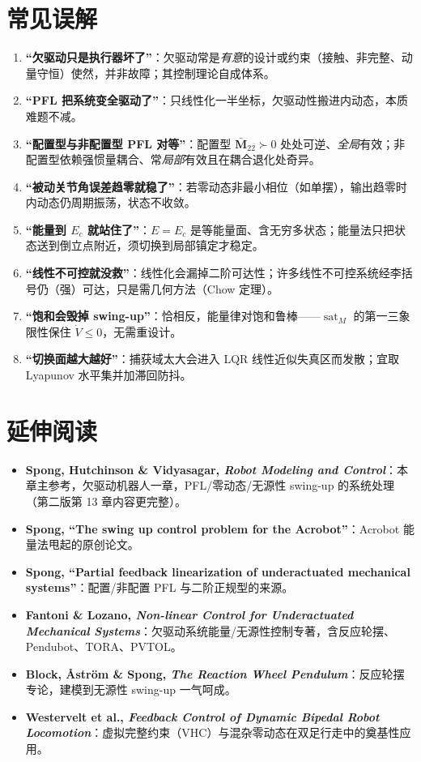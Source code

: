 \section*{常见误解}
\begin{enumerate}
  \item \textbf{“欠驱动只是执行器坏了”}：欠驱动常是\emph{有意}的设计或约束（接触、非完整、动量守恒）使然，并非故障；其控制理论自成体系。
  \item \textbf{“PFL 把系统变全驱动了”}：只线性化一半坐标，欠驱动性搬进内动态，本质难题不减。
  \item \textbf{“配置型与非配置型 PFL 对等”}：配置型 $\bar{\mathbf{M}}_{22}\succ0$ 处处可逆、\emph{全局}有效；非配置型依赖强惯量耦合、常\emph{局部}有效且在耦合退化处奇异。
  \item \textbf{“被动关节角误差趋零就稳了”}：若零动态非最小相位（如单摆），输出趋零时内动态仍周期振荡，状态不收敛。
  \item \textbf{“能量到 $E_c$ 就站住了”}：$E=E_c$ 是等能量面、含无穷多状态；能量法只把状态送到倒立点附近，须切换到局部镇定才稳定。
  \item \textbf{“线性不可控就没救”}：线性化会漏掉二阶可达性；许多线性不可控系统经李括号仍（强）可达，只是需几何方法（Chow 定理）。
  \item \textbf{“饱和会毁掉 swing-up”}：恰相反，能量律对饱和鲁棒——$\operatorname{sat}_M$ 的第一三象限性保住 $\dot{V}\le0$，无需重设计。
  \item \textbf{“切换面越大越好”}：捕获域太大会进入 LQR 线性近似失真区而发散；宜取 Lyapunov 水平集并加滞回防抖。
\end{enumerate}

\section*{延伸阅读}
\begin{itemize}
  \item \textbf{Spong, Hutchinson \& Vidyasagar, \emph{Robot Modeling and Control}}\cite{spong2006robot}：本章主参考，欠驱动机器人一章，PFL/零动态/无源性 swing-up 的系统处理（第二版第 13 章内容更完整）。
  \item \textbf{Spong, ``The swing up control problem for the Acrobot''}\cite{spong1995swingup}：Acrobot 能量法甩起的原创论文。
  \item \textbf{Spong, ``Partial feedback linearization of underactuated mechanical systems''}\cite{spong1994pfl}：配置/非配置 PFL 与二阶正规型的来源。
  \item \textbf{Fantoni \& Lozano, \emph{Non-linear Control for Underactuated Mechanical Systems}}\cite{fantoni2002nonlinear}：欠驱动系统能量/无源性控制专著，含反应轮摆、Pendubot、TORA、PVTOL。
  \item \textbf{Block, Åström \& Spong, \emph{The Reaction Wheel Pendulum}}\cite{block2007reaction}：反应轮摆专论，建模到无源性 swing-up 一气呵成。
  \item \textbf{Westervelt et al., \emph{Feedback Control of Dynamic Bipedal Robot Locomotion}}\cite{westervelt2007feedback}：虚拟完整约束（VHC）与混杂零动态在双足行走中的奠基性应用。
\end{itemize}
